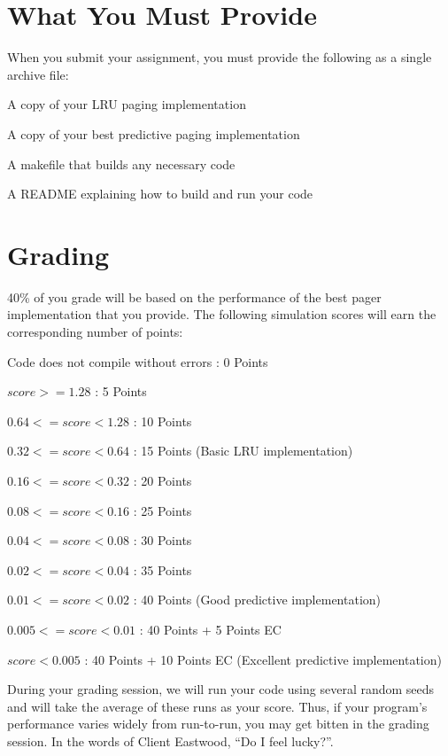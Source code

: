 \documentclass[12pt]{article}
\newenvironment{packed_enum}{
\begin{enumerate}
  \setlength{\itemsep}{1pt}
  \setlength{\parskip}{0pt}
  \setlength{\parsep}{0pt}
}{\end{enumerate}}
\newenvironment{packed_item}{
\begin{itemize}
  \setlength{\itemsep}{1pt}
  \setlength{\parskip}{0pt}
  \setlength{\parsep}{0pt}
}{\end{itemize}}
\begin{document}
\section{What You Must Provide}

When you submit your assignment, you must provide the following as a
single archive file:
\begin{packed_enum}
\item A copy of your LRU paging implementation
\item A copy of your best predictive paging implementation
\item A makefile that builds any necessary code
\item A README explaining how to build and run your code
\end{packed_enum}

\section{Grading}

40\% of you grade will be based on the performance of the
best pager implementation that you provide. The following simulation
scores will earn the corresponding number of points:
\begin{packed_item}
\item Code does not compile without errors : 0 Points
\item $score >= 1.28$ : 5 Points
\item $0.64 <= score < 1.28$ : 10 Points
\item $0.32 <= score < 0.64$ : 15 Points (Basic LRU implementation)
\item $0.16 <= score < 0.32$ : 20 Points
\item $0.08 <= score < 0.16$ : 25 Points
\item $0.04 <= score < 0.08$ : 30 Points
\item $0.02 <= score < 0.04$ : 35 Points
\item $0.01 <= score < 0.02$ : 40 Points (Good predictive implementation)
\item $0.005 <= score < 0.01$ : 40 Points + 5 Points EC
\item $score < 0.005$ : 40 Points + 10 Points EC (Excellent predictive implementation)
\end{packed_item}

During your grading session, we will run your code using several
random seeds and will take the average of these runs as your
score. Thus, if your program's performance varies widely from
run-to-run, you may get bitten in the grading session. In the words of
Client Eastwood, ``Do I feel lucky?''.
\end{document}
